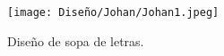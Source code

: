 \begin{figure}[ht!]
  \centering
\texttt{[image: Diseño/Johan/Johan1.jpeg]}
  \caption{Diseño de sopa de letras.}
  
  \label{Johan1}
\end{figure}






























































  
  


















































  
  